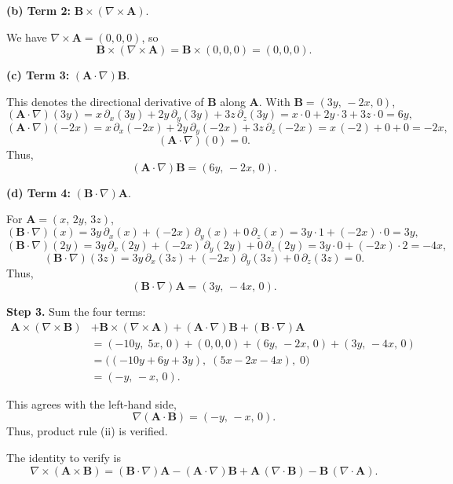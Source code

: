 \begin{hwkProblem}{1.25}{}
	\textbf{(b) Term 2:} \(\mathbf{B}\times(\nabla\times\mathbf{A})\).

	We have \(\nabla\times\mathbf{A} = (0,0,0)\), so
	\[
		\mathbf{B}\times(\nabla\times\mathbf{A}) = \mathbf{B}\times(0,0,0) = (0,0,0).
	\]

	\textbf{(c) Term 3:} \((\mathbf{A}\cdot\nabla)\mathbf{B}\).

	This denotes the directional derivative of \(\mathbf{B}\) along \(\mathbf{A}\). With \(\mathbf{B} = (3y,\,-2x,\,0)\),
	\[
		(\mathbf{A}\cdot\nabla)(3y) = x\,\partial_x(3y) + 2y\,\partial_y(3y) + 3z\,\partial_z(3y)
		= x\cdot 0 + 2y\cdot 3 + 3z\cdot 0 = 6y,
	\]
	\[
		(\mathbf{A}\cdot\nabla)(-2x) = x\,\partial_x(-2x) + 2y\,\partial_y(-2x) + 3z\,\partial_z(-2x)
		= x\,(-2) + 0 + 0 = -2x,
	\]
	\[
		(\mathbf{A}\cdot\nabla)(0) = 0.
	\]
	Thus,
	\[
		(\mathbf{A}\cdot\nabla)\mathbf{B} = (6y,\,-2x,\,0).
	\]

	\textbf{(d) Term 4:} \((\mathbf{B}\cdot\nabla)\mathbf{A}\).

	For \(\mathbf{A} = (x,\,2y,\,3z)\),
	\[
		(\mathbf{B}\cdot\nabla)(x) = 3y\,\partial_x(x) + (-2x)\,\partial_y(x) + 0\,\partial_z(x)
		= 3y\cdot 1 + (-2x)\cdot 0 = 3y,
	\]
	\[
		(\mathbf{B}\cdot\nabla)(2y) = 3y\,\partial_x(2y) + (-2x)\,\partial_y(2y) + 0\,\partial_z(2y)
		= 3y\cdot 0 + (-2x)\cdot 2 = -4x,
	\]
	\[
		(\mathbf{B}\cdot\nabla)(3z) = 3y\,\partial_x(3z) + (-2x)\,\partial_y(3z) + 0\,\partial_z(3z)
		= 0.
	\]
	Thus,
	\[
		(\mathbf{B}\cdot\nabla)\mathbf{A} = (3y,\,-4x,\,0).
	\]

	\textbf{Step 3.} Sum the four terms:
	\[
		\begin{aligned}
			\mathbf{A}\times(\nabla\times\mathbf{B}) &+ \mathbf{B}\times(\nabla\times\mathbf{A})
			+ (\mathbf{A}\cdot\nabla)\mathbf{B} + (\mathbf{B}\cdot\nabla)\mathbf{A} \\
								 &= (-10y,\;5x,\,0) + (0,0,0) + (6y,\,-2x,\,0) + (3y,\,-4x,\,0) \\
								 &= \bigl((-10y+6y+3y),\;(5x-2x-4x),\;0\bigr) \\
								 &= (-y,\,-x,\,0).
		\end{aligned}
	\]

	This agrees with the left-hand side,
	\[
		\nabla(\mathbf{A}\cdot\mathbf{B}) = (-y,\,-x,\,0).
	\]
	Thus, product rule (ii) is verified.



	The identity to verify is
	\[
		\nabla\times(\mathbf{A}\times\mathbf{B}) = (\mathbf{B}\cdot\nabla)\mathbf{A} - (\mathbf{A}\cdot\nabla)\mathbf{B} + \mathbf{A}\,(\nabla\cdot\mathbf{B}) - \mathbf{B}\,(\nabla\cdot\mathbf{A}).
	\]


\end{hwkProblem}
